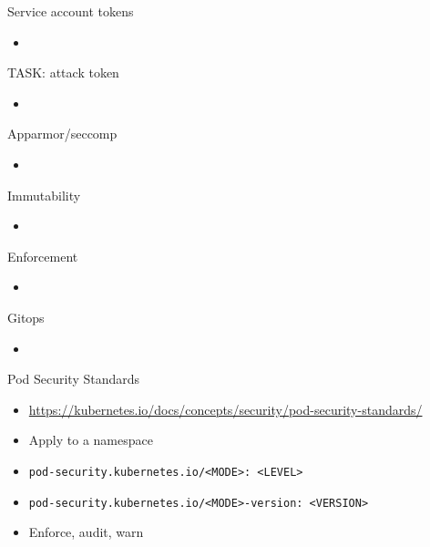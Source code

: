 \documentclass{dcpresentation}
\begin{document}
\begin{frame}{Service account tokens}
  \begin{itemize}
    \item 
  \end{itemize}
\end{frame}

\begin{frame}{TASK: attack token}
  \begin{itemize}
    \item 
  \end{itemize}
\end{frame}

\begin{frame}{Apparmor/seccomp}
  \begin{itemize}
    \item 
  \end{itemize}
\end{frame}

\begin{frame}{Immutability}
  \begin{itemize}
    \item 
  \end{itemize}
\end{frame}


\begin{frame}{Enforcement}
  \begin{itemize}
    \item 
  \end{itemize}
\end{frame}

\begin{frame}{Gitops}
  \begin{itemize}
    \item 
  \end{itemize}
\end{frame}

\begin{frame}{Pod Security Standards}
  \begin{itemize}
  \item \url{https://kubernetes.io/docs/concepts/security/pod-security-standards/}
  \item Apply to a namespace
  \item \texttt{pod-security.kubernetes.io/<MODE>: <LEVEL>}
  \item \texttt{pod-security.kubernetes.io/<MODE>-version: <VERSION>}
  \item Enforce, audit, warn
  \end{itemize}
\end{frame}
\end{document}
